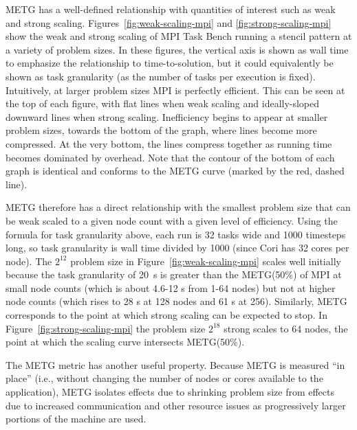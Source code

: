 METG has a well-defined
relationship with quantities of interest such as
weak and strong scaling. Figures~\ref{fig:weak-scaling-mpi} and
\ref{fig:strong-scaling-mpi} show the weak and strong scaling of MPI Task Bench running a stencil pattern at a variety of problem sizes. In these
figures, the vertical axis is shown as wall time to emphasize the
relationship to time-to-solution, but it could equivalently be shown
as task granularity (as the number of tasks per execution is
fixed). Intuitively, at
larger problem sizes MPI is perfectly efficient. This can be seen at
the top of each figure, with flat lines when weak scaling and
ideally-sloped downward lines when strong scaling. Inefficiency begins
to appear at smaller problem sizes, towards the bottom of the graph,
where lines become more compressed. At the
very bottom, the lines compress together as running time becomes
dominated by overhead. Note that the contour of the bottom of each
graph is identical and conforms to the METG curve (marked by the red,
dashed line).



METG therefore has a direct relationship with the smallest problem
size that can be weak scaled to a given node count with a given level
of efficiency. Using the formula for task granularity above, each run
is 32 tasks wide and 1000 timesteps long, so task granularity is wall
time divided by 1000 (since Cori has 32 cores per node). The $2^{12}$
problem size in Figure~\ref{fig:weak-scaling-mpi} scales well
initially because the task granularity of 20~\textmu{}s is greater
than the METG(50\%) of MPI at small node counts (which is about 4.6-12
\textmu{}s from 1-64 nodes) but not at higher node counts (which rises
to 28 \textmu{}s at 128 nodes and 61 \textmu{}s at 256). Similarly,
METG corresponds to the point at which strong scaling can be expected
to stop. In Figure~\ref{fig:strong-scaling-mpi} the problem size
$2^{18}$ strong scales to 64 nodes, the point at which the
scaling curve intersects METG(50\%).

The METG metric has another useful property. Because METG is measured ``in place'' (i.e.,
without changing the number of nodes or cores available to the
application), METG isolates effects
due to shrinking problem size from effects due to
increased communication and other resource issues as
progressively larger portions of the machine are used.
